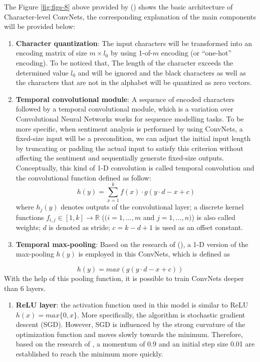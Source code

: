 \documentclass[]{krantz}
\providecommand{\tightlist}{%
  \setlength{\itemsep}{0pt}\setlength{\parskip}{0pt}}
\begin{document}
The Figure \ref{fig:figs-8} above provided by (\citet{Zhang2015CharacterlevelCN}) shows the basic architecture of Character-level ConvNets, the corresponding explanation of the main components will be provided below:

\begin{enumerate}
\def\labelenumi{\arabic{enumi}.}
\item
  \textbf{Character quantization}: The input characters will be transformed into an encoding matrix of size \(m \times l_0\) by using 1-of-\(m\) encoding (or ``one-hot'' encoding). To be noticed that, The length of the character exceeds the determined value \(l_0\) and will be ignored and the black characters as well as the characters that are not in the alphabet will be quantized as zero vectors.
\item
  \textbf{Temporal convolutional module}: A sequence of encoded characters followed by a temporal convolutional module, which is a variation over Convolutional Neural Networks works for sequence modelling tasks. To be more specific, when sentiment analysis is performed by using ConvNets, a fixed-size input will be a precondition, we can adjust the initial input length by truncating or padding the actual input to satisfy this criterion without affecting the sentiment and sequentially generate fixed-size outputs. Conceptually, this kind of 1-D convolution is called temporal convolution and the convolutional function defined as follow:
  \[h(y)=\sum_{x=1}^{k}f(x)\cdot g(y \cdot d -x+c)\]
  where \(h_{j}(y)\) denotes outputs of the convolutional layer; a discrete kernel functions \(f_{i,j} \in [1,k] \to \mathbb{R}\) (\((i=1,...,m\) and \(j=1,...,n)\)) is also called weights; \(d\) is denoted as stride; \(c= k-d+1\) is used as an offset constant.
\item
  \textbf{Temporal max-pooling}: Based on the research of (\citet{Boureau2010ATA}), a 1-D version of the max-pooling \(h(y)\) is employed in this ConvNets, which is defined as
\end{enumerate}

\[h(y)=max (g(y \cdot d -x+c))\]
With the help of this pooling function, it is possible to train ConvNets deeper than 6 layers.

\begin{enumerate}
\def\labelenumi{\arabic{enumi}.}
\setcounter{enumi}{3}
\tightlist
\item
  \textbf{ReLU layer}: the activation function used in this model is similar to ReLU \(h(x)=max\{0,x\}\). More specifically, the algorithm is stochastic gradient descent (SGD). However, SGD is influenced by the strong curvature of the optimization function and moves slowly towards the minimum. Therefore, based on the research of \citet{Sutskever2013OnTI}, a momentum of 0.9 and an initial step size 0.01 are established to reach the minimum more quickly.
\end{enumerate}
\end{document}

